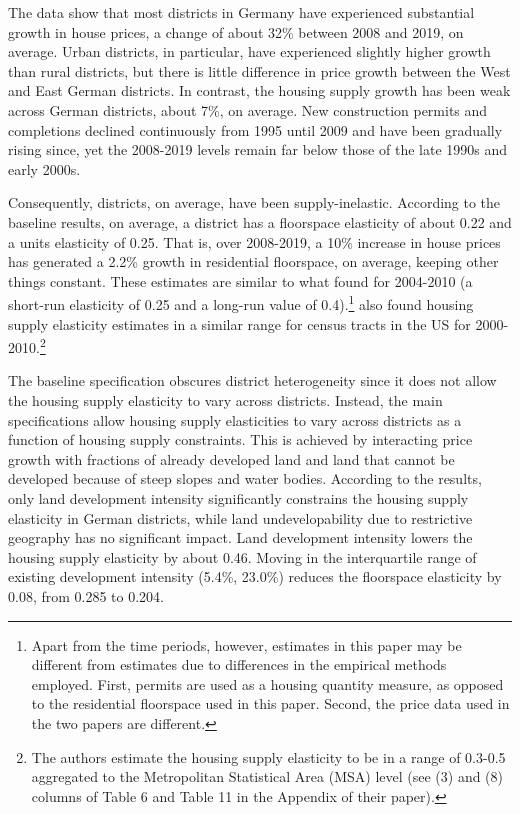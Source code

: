\documentclass[
  12pt,
]{article}
\begin{document}
The data show that most districts in Germany have experienced
substantial growth in house prices, a change of about 32\% between 2008
and 2019, on average. Urban districts, in particular, have experienced
slightly higher growth than rural districts, but there is little
difference in price growth between the West and East German districts.
In contrast, the housing supply growth has been weak across German
districts, about 7\%, on average. New construction permits and
completions declined continuously from 1995 until 2009 and have been
gradually rising since, yet the 2008-2019 levels remain far below those
of the late 1990s and early 2000s.

Consequently, districts, on average, have been supply-inelastic.
According to the baseline results, on average, a district has a
floorspace elasticity of about 0.22 and a units elasticity of 0.25. That
is, over 2008-2019, a 10\% increase in house prices has generated a
2.2\% growth in residential floorspace, on average, keeping other things
constant. These estimates are similar to what \citet{lerbs_2014} found
for 2004-2010 (a short-run elasticity of 0.25 and a long-run value of
0.4).\footnote{Apart from the time periods, however, estimates in this
  paper may be different from \citet{lerbs_2014} estimates due to
  differences in the empirical methods employed. First, permits are used
  as a housing quantity measure, as opposed to the residential
  floorspace used in this paper. Second, the price data used in the two
  papers are different.} \citet{baum-snow_han_2019} also found housing
supply elasticity estimates in a similar range for census tracts in the
US for 2000-2010.\footnote{The authors estimate the housing supply
  elasticity to be in a range of 0.3-0.5 aggregated to the Metropolitan
  Statistical Area (MSA) level (see (3) and (8) columns of Table 6 and
  Table 11 in the Appendix of their paper).}

The baseline specification obscures district heterogeneity since it does
not allow the housing supply elasticity to vary across districts.
Instead, the main specifications allow housing supply elasticities to
vary across districts as a function of housing supply constraints. This
is achieved by interacting price growth with fractions of already
developed land and land that cannot be developed because of steep slopes
and water bodies. According to the results, only land development
intensity significantly constrains the housing supply elasticity in
German districts, while land undevelopability due to restrictive
geography has no significant impact. Land development intensity lowers
the housing supply elasticity by about 0.46. Moving in the interquartile
range of existing development intensity (5.4\%, 23.0\%) reduces the
floorspace elasticity by 0.08, from 0.285 to 0.204.
\end{document}
